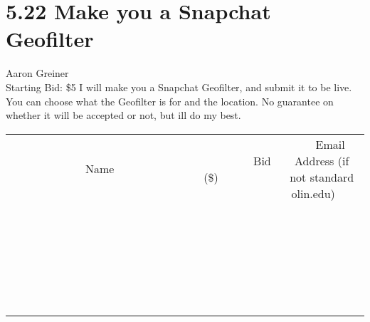 \documentclass[11pt]{article}
\begin{document}
\section*{5.22 Make you a Snapchat Geofilter}
Aaron Greiner
\\
Starting Bid: \$5
\newline
I will make you a Snapchat Geofilter, and submit it to be live. You can choose what the Geofilter is for and the location. No guarantee on whether it will be accepted or not, but ill do my best.
\\[6ex]
\begin{tabular}{c c c}
~~~~~~~~~~~~~Name~~~~~~~~~~~~~ & ~~~~~~~~~Bid (\$)~~~~~~~~~  & ~~~Email Address (if not standard olin.edu)~~~\\
 & & \\
\hline
 & & \\
\hline
 & & \\
\hline
 & & \\
\hline
 & & \\
\hline
 & & \\
\hline
 & & \\
\hline
 & & \\
\hline
 & & \\
\hline
 & & \\
\hline
 & & \\
\hline
 & & \\
\hline
 & & \\
\hline
 & & \\
\hline
 & & \\
\hline
 & & \\
\hline
 & & \\
\hline
 & & \\
\hline
 & & \\
\hline
 & & \\
\hline
 & & \\
\hline
 & & \\
\hline
 & & \\
\hline
 & & \\
\hline
 & & \\
\hline
 & & \\
\hline
\end{tabular}
\newpage
\end{document}
